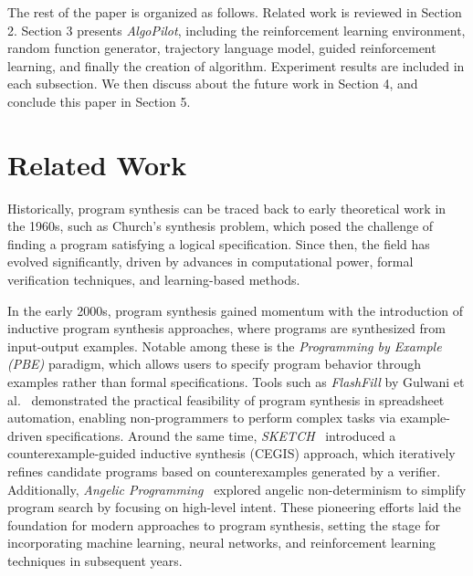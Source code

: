 \documentclass[pdflatex,sn-mathphys-num]{sn-jnl}%
\theoremstyle{thmstyleone}%
\theoremstyle{thmstyletwo}%
\theoremstyle{thmstylethree}%
\begin{document}
The rest of the paper is organized as follows. Related work is reviewed in Section 2. Section 3 presents \emph{AlgoPilot}, including the reinforcement learning environment, random function generator, trajectory language model, guided reinforcement learning, and finally the creation of algorithm. Experiment results are included in each subsection. We then discuss about the future work in Section 4, and conclude this paper in Section 5.



\section{Related Work}\label{sec2}

Historically, program synthesis can be traced back to early theoretical work in the 1960s, such as Church's synthesis problem, which posed the challenge of finding a program satisfying a logical specification. Since then, the field has evolved significantly, driven by advances in computational power, formal verification techniques, and learning-based methods.

In the early 2000s, program synthesis gained momentum with the introduction of inductive program synthesis approaches, where programs are synthesized from input-output examples. Notable among these is the \textit{Programming by Example (PBE)} paradigm, which allows users to specify program behavior through examples rather than formal specifications. Tools such as \textit{FlashFill} by Gulwani et al.~\cite{gulwani2011automating} demonstrated the practical feasibility of program synthesis in spreadsheet automation, enabling non-programmers to perform complex tasks via example-driven specifications. Around the same time, \textit{SKETCH}~\cite{solar2008program} introduced a counterexample-guided inductive synthesis (CEGIS) approach, which iteratively refines candidate programs based on counterexamples generated by a verifier. Additionally, \textit{Angelic Programming}~\cite{bodik2007angelic} explored angelic non-determinism to simplify program search by focusing on high-level intent. These pioneering efforts laid the foundation for modern approaches to program synthesis, setting the stage for incorporating machine learning, neural networks, and reinforcement learning techniques in subsequent years.
\end{document}
